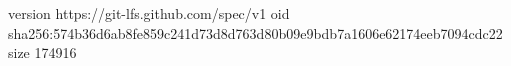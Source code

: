 version https://git-lfs.github.com/spec/v1
oid sha256:574b36d6ab8fe859c241d73d8d763d80b09e9bdb7a1606e62174eeb7094cdc22
size 174916
